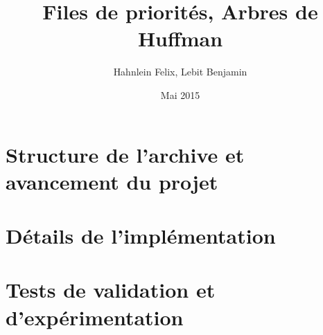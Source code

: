 \documentclass[a4paper,11pt]{article}
\title{Files de priorités, Arbres de Huffman}
\author{Hahnlein Felix, Lebit Benjamin}
\date{Mai 2015}
\begin{document}
\maketitle

\section{Structure de l'archive et avancement du projet}

\section{Détails de l'implémentation}

\section{Tests de validation et d'expérimentation} 
\end{document}
